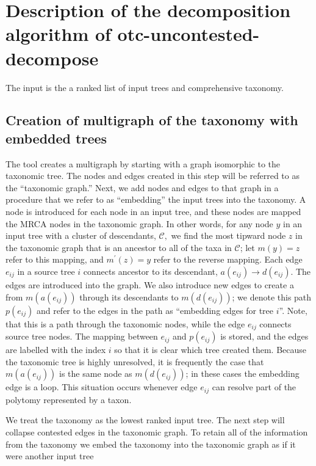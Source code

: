 \documentclass[fleqn,12pt,lineno,english]{wlpeerj}
\begin{document}
\section{Description of the decomposition algorithm of otc-uncontested-decompose}\label{sec:Decompose-algorithm}

The input is the a ranked list of input trees and comprehensive taxonomy. 

\subsection{Creation of multigraph of the taxonomy with embedded trees}

The tool creates a multigraph by starting with a graph isomorphic
to the taxonomic tree. The nodes and edges created in this step will
be referred to as the ``taxonomic graph.'' Next, we add nodes and
edges to that graph in a procedure that we refer to as ``embedding''
the input trees into the taxonomy. A node is introduced for each node
in an input tree, and these nodes are mapped the MRCA nodes in the
taxonomic graph. In other words, for any node $y$ in an input tree
with a cluster of descendants, $\mathcal{C},$ we find the most tipward
node $z$ in the taxonomic graph that is an ancestor to all of the
taxa in $\mathcal{C}$; let $m(y)=z$ refer to this mapping, and $m^{\prime}(z)=y$
refer to the reverse mapping. Each edge $e_{ij}$ in a source tree
$i$ connects ancestor to its descendant, $a(e_{ij})\rightarrow d(e_{ij})$.
The edges are introduced into the graph. We also introduce new edges
to create a from $m(a(e_{ij}))$ through its descendants to $m(d(e_{ij}))$;
we denote this path $p(e_{ij})$ and refer to the edges in the path
as ``embedding edges for tree $i$''. Note, that this is a path
through the taxonomic nodes, while the edge $e_{ij}$ connects source
tree nodes. The mapping between $e_{ij}$ and $p(e_{ij})$ is stored,
and the edges are labelled with the index $i$ so that it is clear
which tree created them. Because the taxonomic tree is highly unresolved,
it is frequently the case that $m(a(e_{ij}))$ is the same node as
$m(d(e_{ij}))$; in these cases the embedding edge is a loop. This
situation occurs whenever edge $e_{ij}$ can resolve part of the polytomy
represented by a taxon. 

We treat the taxonomy as the lowest ranked input tree. The next step
will collapse contested edges in the taxonomic graph. To retain all
of the information from the taxonomy we embed the taxonomy into the
taxonomic graph as if it were another input tree
\end{document}
